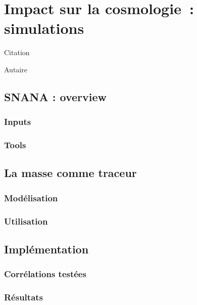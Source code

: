 \documentclass[../main/main.tex]{subfiles}
\begin{document}
\chapter{Impact sur la cosmologie~: simulations}\label{ch:snana}

\epigraph{Citation}{Autaire}

\minitoc
\newpage

\section{SNANA : overview}\label{sec:snana}

\subsection{Inputs}\label{ssec:xxx}

\subsection{Tools}\label{ssec:xxx}


\section{La masse comme traceur}\label{sec:mtrac}

\subsection{Modélisation}\label{ssec:mmod}

\subsection{Utilisation}\label{ssec:mkhost}


\section{Implémentation}\label{sec:snaimpl} 

\subsection{Corrélations testées}\label{ssec:snamod}

\subsection{Résultats}\label{ssec:snares}
\end{document}

